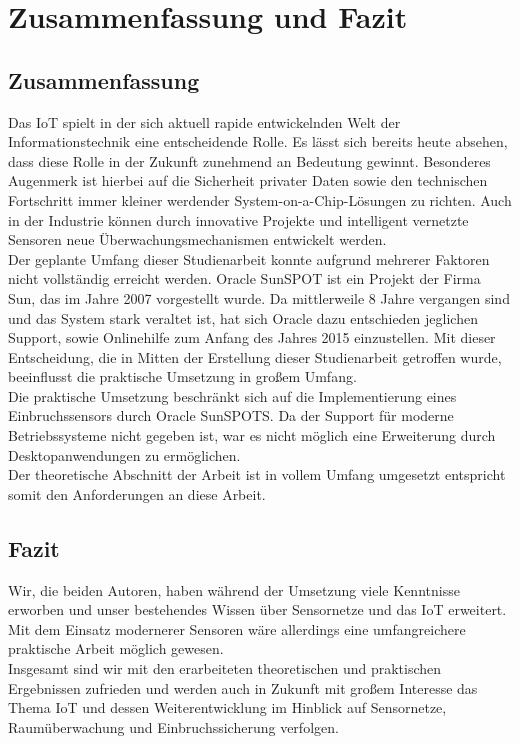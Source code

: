 \chapter{Zusammenfassung und Fazit}\label{c:Zusammenfassung} %

\section*{Zusammenfassung}
Das \ac{IoT} spielt in der sich aktuell rapide entwickelnden Welt der Informationstechnik eine entscheidende Rolle. Es lässt sich bereits heute absehen, dass diese Rolle in der Zukunft zunehmend an Bedeutung gewinnt. Besonderes Augenmerk ist hierbei auf die Sicherheit privater Daten sowie den technischen Fortschritt immer kleiner werdender System-on-a-Chip-Lösungen zu richten. Auch in der Industrie können durch innovative Projekte und intelligent vernetzte Sensoren neue Überwachungsmechanismen entwickelt werden.\\

Der geplante Umfang dieser Studienarbeit konnte aufgrund mehrerer Faktoren nicht vollständig erreicht werden. 
Oracle SunSPOT ist ein Projekt der Firma Sun, das im Jahre 2007 vorgestellt wurde. Da mittlerweile 8 Jahre vergangen sind und das System stark veraltet ist, hat sich Oracle dazu entschieden jeglichen Support, sowie Onlinehilfe zum Anfang des Jahres 2015 einzustellen. Mit dieser Entscheidung, die in Mitten der Erstellung dieser Studienarbeit getroffen wurde, beeinflusst die praktische Umsetzung in großem Umfang.\\

Die praktische Umsetzung beschränkt sich auf die Implementierung eines Einbruchssensors durch Oracle SunSPOTS. Da der Support für moderne Betriebssysteme nicht gegeben ist, war es nicht möglich eine Erweiterung durch Desktopanwendungen zu ermöglichen. \\

Der theoretische Abschnitt der Arbeit ist in vollem Umfang umgesetzt entspricht somit den Anforderungen an diese Arbeit.\newpage

\section*{Fazit}

Wir, die beiden Autoren, haben während der Umsetzung viele Kenntnisse erworben und unser bestehendes Wissen über Sensornetze und das \ac{IoT} erweitert. Mit dem Einsatz modernerer Sensoren wäre allerdings eine umfangreichere praktische Arbeit möglich gewesen.\\

Insgesamt sind wir mit den erarbeiteten theoretischen und praktischen Ergebnissen zufrieden und werden auch in Zukunft mit großem Interesse das Thema \ac{IoT} und dessen Weiterentwicklung im Hinblick auf Sensornetze, Raumüberwachung und Einbruchssicherung verfolgen. 